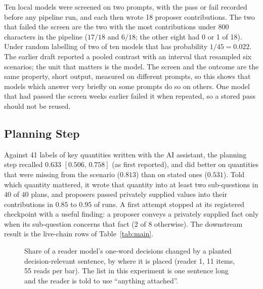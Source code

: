 \documentclass[10pt,twocolumn]{article}
\newcommand{\ci}[2]{\ensuremath{[#1,\,#2]}}
\begin{document}
Ten local models were screened on two prompts, with the pass or fail
recorded before any pipeline run, and each then wrote 18 proposer
contributions. The two that failed the screen are the two with the most
contributions under 800 characters in the pipeline ($17/18$ and
$6/18$; the other eight had 0 or 1 of 18). Under random labelling of
two of ten models that has probability $1/45 = 0.022$. The earlier
draft reported a pooled contrast with an interval that resampled six
scenarios; the unit that matters is the model. The screen and the
outcome are the same property, short output, measured on different
prompts, so this shows that models which answer very briefly on some
prompts do so on others. One model that had passed the screen weeks
earlier failed it when repeated, so a stored pass should not be reused.

\subsection{Planning Step}
\label{sec:res-planner}

Against 41 labels of key quantities written with the AI assistant, the
planning step recalled $0.633$ \ci{0.506}{0.758} (as first reported),
and did better on quantities that were missing from the scenario
($0.813$) than on stated ones ($0.531$). Told which quantity mattered,
it wrote that quantity into at least two sub-questions in $40$ of $40$
plans, and proposers passed privately supplied values into their
contributions in $0.85$ to $0.95$ of runs. A first attempt stopped at
its registered checkpoint with a useful finding: a proposer conveys a
privately supplied fact only when its sub-question concerns that fact
($2$ of $8$ otherwise). The downstream result is the live-chain rows of
Table~\ref{tab:main}.

\begin{figure}[t]
\centering
{}
\caption{Share of a reader model's one-word decisions changed by a
planted decision-relevant sentence, by where it is placed (reader 1,
11 items, 55 reads per bar). The list in this experiment is one
sentence long and the reader is told to use ``anything attached''.}
\label{fig:freight}
\end{figure}
\end{document}
